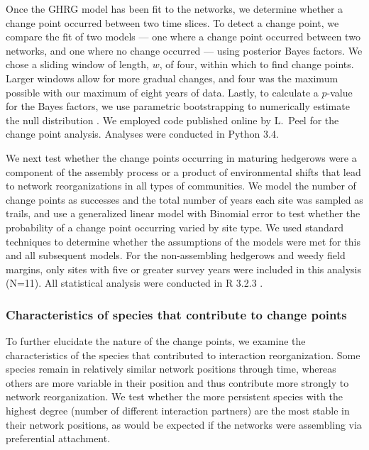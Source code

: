 \documentclass[12pt]{article}
\begin{document}
Once the GHRG model has been fit to the networks, we determine whether
a change point occurred between two time slices. To detect a change
point, we compare the fit of two models --- one where a change point
occurred between two networks, and one where no change occurred ---
using posterior Bayes factors. We chose a sliding window of length,
$w$, of four, within which to find change points. Larger windows allow
for more gradual changes, and four was the maximum possible with our
maximum of eight years of data. Lastly, to calculate a $p$-value for
the Bayes factors, we use parametric bootstrapping to numerically
estimate the null distribution \citep{peel2014detecting}. We employed
code published online by L.~Peel for the change point
analysis. Analyses were conducted in Python 3.4.

We next test whether the change points occurring in maturing hedgerows
were a component of the assembly process or a product of environmental
shifts that lead to network reorganizations in all types of
communities. We model the number of change points as successes and the
total number of years each site was sampled as trails, and use a
generalized linear model with Binomial error to test whether the
probability of a change point occurring varied by site type. We used
standard techniques to determine whether the assumptions of the models
were met for this and all subsequent models. For the non-assembling
hedgerows and weedy field margins, only sites with five or greater
survey years were included in this analysis (N=11). All statistical
analysis were conducted in R 3.2.3 \citep{R}.

\subsubsection*{Characteristics of species that contribute to change
  points}

To further elucidate the nature of the change points, we examine the
characteristics of the species that contributed to interaction
reorganization. Some species remain in relatively similar network
positions through time, whereas others are more variable in their
position and thus contribute more strongly to network
reorganization. We test whether the more persistent species with the
highest degree (number of different interaction partners) are the
most stable in their network positions, as would be expected if the
networks were assembling via preferential attachment.
\end{document}
